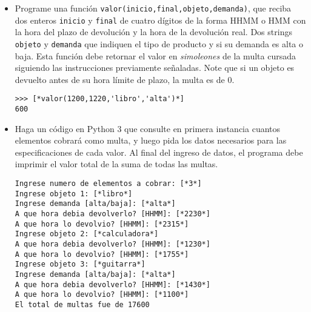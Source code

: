 \begin{itemize}
    \item Programe una función \texttt{valor(inicio,final,objeto,demanda)}, que reciba dos enteros \texttt{inicio} y \texttt{final} de cuatro dígitos de la forma HHMM o HMM con la hora del plazo de devolución y la hora de la devolución real. Dos strings \texttt{objeto} y \texttt{demanda} que indiquen el tipo de producto y si su demanda es alta o baja. Esta función debe retornar el valor en \textit{simoleones} de la multa cursada siguiendo las instrucciones previamente señaladas. Note que si un objeto es devuelto antes de su hora límite de plazo, la multa es de 0.
\begin{lstlisting}[style=consola]
>>> [*valor(1200,1220,'libro','alta')*]
600
\end{lstlisting}
    \item Haga un código en Python 3 que consulte en primera instancia cuantos elementos cobrará como multa, y luego pida los datos necesarios para las especificaciones de cada valor. Al final del ingreso de datos, el programa debe imprimir el valor total de la suma de todas las multas.
\begin{lstlisting}[style=consola]
Ingrese numero de elementos a cobrar: [*3*]
Ingrese objeto 1: [*libro*]
Ingrese demanda [alta/baja]: [*alta*]
A que hora debia devolverlo? [HHMM]: [*2230*]
A que hora lo devolvio? [HHMM]: [*2315*]
Ingrese objeto 2: [*calculadora*]
A que hora debia devolverlo? [HHMM]: [*1230*]
A que hora lo devolvio? [HHMM]: [*1755*]
Ingrese objeto 3: [*guitarra*]
Ingrese demanda [alta/baja]: [*alta*]
A que hora debia devolverlo? [HHMM]: [*1430*]
A que hora lo devolvio? [HHMM]: [*1100*]
El total de multas fue de 17600
\end{lstlisting}
\end{itemize}